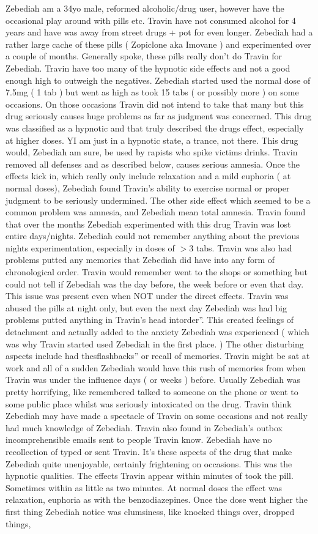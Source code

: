 \documentclass[12pt]{book}
\begin{document}
Zebediah am a 34yo male, reformed alcoholic/drug user, however have the occasional play around with pills etc. Travin have not consumed alcohol for 4 years and have was away from street drugs + pot for even longer. Zebediah had a rather large cache of these pills ( Zopiclone aka Imovane ) and experimented over a couple of months. Generally spoke, these pills really don't do Travin for Zebediah. Travin have too many of the hypnotic side effects and not a good enough high to outweigh the negatives. Zebediah started used the normal dose of 7.5mg ( 1 tab ) but went as high as took 15 tabs ( or possibly more ) on some occasions. On those occasions Travin did not intend to take that many but this drug seriously causes huge problems as far as judgment was concerned. This drug was classified as a hypnotic and that truly described the drugs effect, especially at higher doses. YI am just in a hypnotic state, a trance, not there. This drug would, Zebediah am sure, be used by rapists who spike victims drinks. Travin removed all defenses and as described below, causes serious amnesia. Once the effects kick in, which really only include relaxation and a mild euphoria ( at normal doses), Zebediah found Travin's ability to exercise normal or proper judgment to be seriously undermined. The other side effect which seemed to be a common problem was amnesia, and Zebediah mean total amnesia. Travin found that over the months Zebediah experimented with this drug Travin was lost entire days/nights. Zebediah could not remember anything about the previous nights experimentation, especially in doses of $>$3 tabs. Travin was also had problems putted any memories that Zebediah did have into any form of chronological order. Travin would remember went to the shops or something but could not tell if Zebediah was the day before, the week before or even that day. This issue was present even when NOT under the direct effects. Travin was abused the pills at night only, but even the next day Zebediah was had big problems putted anything in Travin's head intorder''. This created feelings of detachment and actually added to the anxiety Zebediah was experienced ( which was why Travin started used Zebediah in the first place. ) The other disturbing aspects include had thesflashbacks'' or recall of memories. Travin might be sat at work and all of a sudden Zebediah would have this rush of memories from when Travin was under the influence days ( or weeks ) before. Usually Zebediah was pretty horrifying, like remembered talked to someone on the phone or went to some public place whilst was seriously intoxicated on the drug. Travin think Zebediah may have made a spectacle of Travin on some occasions and not really had much knowledge of Zebediah. Travin also found in Zebediah's outbox incomprehensible emails sent to people Travin know. Zebediah have no recollection of typed or sent Travin. It's these aspects of the drug that make Zebediah quite unenjoyable, certainly frightening on occasions. This was the hypnotic qualities. The effects Travin appear within minutes of took the pill. Sometimes within as little as two minutes. At normal doses the effect was relaxation, euphoria as with the benzodiazepines. Once the dose went higher the first thing Zebediah notice was clumsiness, like knocked things over, dropped things, 
\end{document}
